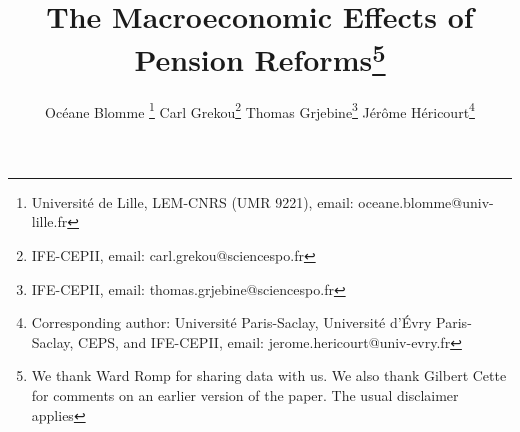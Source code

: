 \documentclass[11pt,english,a4paper, twoside, authoryear]{article}
\begin{document}
\baselineskip17pt

\title{\textbf{The Macroeconomic Effects of Pension Reforms}\thanks{We thank Ward Romp for sharing data with us. We also thank Gilbert Cette for comments on an earlier version of the paper. The usual disclaimer applies}}




\author{Océane Blomme \footnote{Universit\'{e} de Lille, LEM-CNRS (UMR 9221), email: oceane.blomme@univ-lille.fr} \quad Carl Grekou\footnote{IFE-CEPII, email: carl.grekou@sciencespo.fr} \quad Thomas Grjebine\footnote{IFE-CEPII, email: thomas.grjebine@sciencespo.fr} \quad Jérôme Héricourt\footnote{Corresponding author: Université Paris-Saclay, Université d'Évry Paris-Saclay, CEPS, and IFE-CEPII, email: jerome.hericourt@univ-evry.fr}
}



\maketitle




\end{document}
